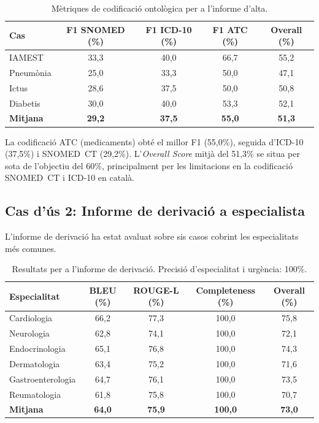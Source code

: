 \documentclass[CAT]{TFUOC}%
\begin{document}
\begin{table}[H]
\centering
\small
\begin{tabular}{lcccc}
\hline
\textbf{Cas} & \textbf{F1 SNOMED (\%)} & \textbf{F1 ICD-10 (\%)} & \textbf{F1 ATC (\%)} & \textbf{Overall (\%)} \\
\hline
IAMEST & 33,3 & 40,0 & 66,7 & 55,2 \\
Pneumònia & 25,0 & 33,3 & 50,0 & 47,1 \\
Ictus & 28,6 & 37,5 & 50,0 & 50,8 \\
Diabetis & 30,0 & 40,0 & 53,3 & 52,1 \\
\hline
\textbf{Mitjana} & \textbf{29,2} & \textbf{37,5} & \textbf{55,0} & \textbf{51,3} \\
\hline
\end{tabular}
\caption{Mètriques de codificació ontològica per a l'informe d'alta.}
\label{tab:discharge-ontology}
\end{table}

La codificació ATC (medicaments) obté el millor F1 (55,0\%), seguida d'ICD-10 (37,5\%) i SNOMED~CT (29,2\%). L'\textit{Overall Score} mitjà del 51,3\% se situa per sota de l'objectiu del 60\%, principalment per les limitacions en la codificació SNOMED~CT i ICD-10 en català.

\subsection{Cas d'ús 2: Informe de derivació a especialista}

L'informe de derivació ha estat avaluat sobre sis casos cobrint les especialitats més comunes.

\begin{table}[H]
\centering
\small
\begin{tabular}{lcccc}
\hline
\textbf{Especialitat} & \textbf{BLEU (\%)} & \textbf{ROUGE-L (\%)} & \textbf{Completeness (\%)} & \textbf{Overall (\%)} \\
\hline
Cardiologia & 66,2 & 77,3 & 100,0 & 75,8 \\
Neurologia & 62,8 & 74,1 & 100,0 & 72,1 \\
Endocrinologia & 65,1 & 76,8 & 100,0 & 74,3 \\
Dermatologia & 63,4 & 75,2 & 100,0 & 71,6 \\
Gastroenterologia & 64,7 & 76,1 & 100,0 & 73,5 \\
Reumatologia & 61,8 & 75,8 & 100,0 & 70,7 \\
\hline
\textbf{Mitjana} & \textbf{64,0} & \textbf{75,9} & \textbf{100,0} & \textbf{73,0} \\
\hline
\end{tabular}
\caption{Resultats per a l'informe de derivació. Precisió d'especialitat i urgència: 100\%.}
\label{tab:referral-results}
\end{table}
\end{document}
